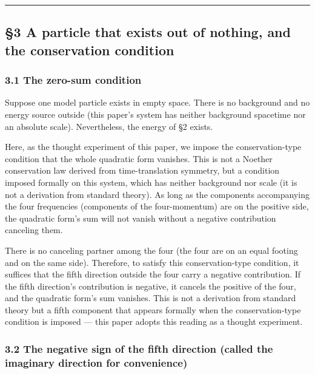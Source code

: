 \documentclass[
]{article}
\begin{document}
\begin{center}\rule{0.5\linewidth}{0.5pt}\end{center}

\subsection{§3 A particle that exists out of nothing, and the
conservation
condition}\label{a-particle-that-exists-out-of-nothing-and-the-conservation-condition}

\subsubsection{3.1 The zero-sum condition}\label{the-zero-sum-condition}

Suppose one model particle exists in empty space. There is no background
and no energy source outside (this paper's system has neither background
spacetime nor an absolute scale). Nevertheless, the energy of §2 exists.

Here, as the thought experiment of this paper, we impose the
conservation-type condition that the whole quadratic form vanishes. This
is not a Noether conservation law derived from time-translation
symmetry, but a condition imposed formally on this system, which has
neither background nor scale (it is not a derivation from standard
theory). As long as the components accompanying the four frequencies
(components of the four-momentum) are on the positive side, the
quadratic form's sum will not vanish without a negative contribution
canceling them.

There is no canceling partner among the four (the four are on an equal
footing and on the same side). Therefore, to satisfy this
conservation-type condition, it suffices that the fifth direction
outside the four carry a negative contribution. If the fifth direction's
contribution is negative, it cancels the positive of the four, and the
quadratic form's sum vanishes. This is not a derivation from standard
theory but a fifth component that appears formally when the
conservation-type condition is imposed --- this paper adopts this
reading as a thought experiment.

\subsubsection{3.2 The negative sign of the fifth direction (called the
imaginary direction for
convenience)}\label{the-negative-sign-of-the-fifth-direction-called-the-imaginary-direction-for-convenience}
\end{document}
